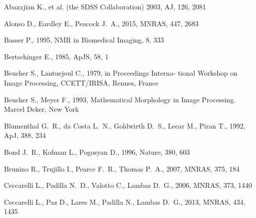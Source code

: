 \documentclass[a4,useAMS,usenatbib,usegraphicx]{mn2e}
\newcommand{\apj}{ApJ}
\newcommand{\apjs}{ApJS}
\newcommand{\aj}{AJ}
\newcommand{\mnras}{MNRAS}
\newcommand{\nat}{Nature}
\begin{document}

%
\begin{thebibliography}{}

{Abazajian} K.,  et al.   {(the SDSS Collaboration)} 2003, \aj, 126, 2081

{Alonso} D.,  {Eardley} E.,    {Peacock} J.~A.,  2015, \mnras, 447, 2683

{Basser} P.,  1995, NMR in Biomedical Imaging, 8, 333

{Bertschinger} E.,  1985, \apjs, 58, 1

{Beucher} S.,  {Lantuejoul} C.,  1979, in Proceedings Interna- tional Workshop
  on Image Processing, CCETT/IRISA, Rennes, France

{Beucher} S.,  {Meyer} F.,  1993, {Mathematical Morphology in Image
  Processing}.
Marcel Deker, New York

{Blumenthal} G.~R.,  {da Costa} L.~N.,  {Goldwirth} D.~S.,  {Lecar} M.,
  {Piran} T.,  1992, \apj, 388, 234

{Bond} J.~R.,  {Kofman} L.,    {Pogosyan} D.,  1996, \nat, 380, 603

{Brunino} R.,  {Trujillo} I.,  {Pearce} F.~R.,    {Thomas} P.~A.,  2007,
  \mnras, 375, 184

{Ceccarelli} L.,  {Padilla} N.~D.,  {Valotto} C.,    {Lambas} D.~G.,  2006,
  \mnras, 373, 1440

{Ceccarelli} L.,  {Paz} D.,  {Lares} M.,  {Padilla} N.,    {Lambas} D.~G.,
  2013, \mnras, 434, 1435


\end{thebibliography}
\end{document}
